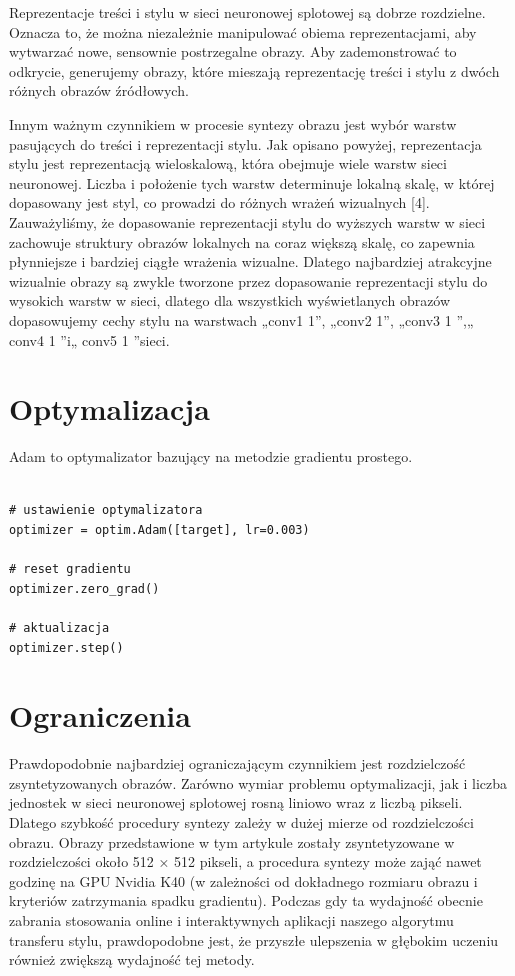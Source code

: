 \documentclass[brudnopis]{xmgr}
\begin{document}
Reprezentacje treści i stylu w sieci neuronowej splotowej są dobrze rozdzielne. Oznacza to, że można niezależnie manipulować obiema reprezentacjami, aby wytwarzać nowe, sensownie postrzegalne obrazy. Aby zademonstrować to odkrycie, generujemy obrazy, które mieszają reprezentację treści i stylu z dwóch różnych obrazów źródłowych.

Innym ważnym czynnikiem w procesie syntezy obrazu jest wybór warstw pasujących do treści i reprezentacji stylu. Jak opisano powyżej, reprezentacja stylu jest reprezentacją wieloskalową, która obejmuje wiele warstw sieci neuronowej. Liczba i położenie tych warstw determinuje lokalną skalę, w której dopasowany jest styl, co prowadzi do różnych wrażeń wizualnych [4]. Zauważyliśmy, że dopasowanie reprezentacji stylu do wyższych warstw w sieci zachowuje struktury obrazów lokalnych na coraz większą skalę, co zapewnia płynniejsze i bardziej ciągłe wrażenia wizualne. Dlatego najbardziej atrakcyjne wizualnie obrazy są zwykle tworzone przez dopasowanie reprezentacji stylu do wysokich warstw w sieci, dlatego dla wszystkich wyświetlanych obrazów dopasowujemy cechy stylu na warstwach „conv1 1”, „conv2 1”, „conv3 1 ”,„ conv4 1 ”i„ conv5 1 ”sieci.

\section{Optymalizacja\label{s:dsssl}}

Adam to optymalizator bazujący na metodzie gradientu prostego.

\begin{lstlisting}

# ustawienie optymalizatora
optimizer = optim.Adam([target], lr=0.003)
      
# reset gradientu
optimizer.zero_grad()
      
# aktualizacja
optimizer.step()

\end{lstlisting}

						
\section{Ograniczenia\label{s:dsssl}}

Prawdopodobnie najbardziej ograniczającym czynnikiem jest rozdzielczość zsyntetyzowanych obrazów. Zarówno wymiar problemu optymalizacji, jak i liczba jednostek w sieci neuronowej splotowej rosną liniowo wraz z liczbą pikseli. Dlatego szybkość procedury syntezy zależy w dużej mierze od rozdzielczości obrazu. Obrazy przedstawione w tym artykule zostały zsyntetyzowane w rozdzielczości około 512 × 512 pikseli, a procedura syntezy może zająć nawet godzinę na GPU Nvidia K40 (w zależności od dokładnego rozmiaru obrazu i kryteriów zatrzymania spadku gradientu). Podczas gdy ta wydajność obecnie zabrania stosowania online i interaktywnych aplikacji naszego algorytmu transferu stylu, prawdopodobne jest, że przyszłe ulepszenia w głębokim uczeniu również zwiększą wydajność tej metody.
\end{document}

